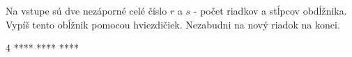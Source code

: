 




Na vstupe sú dve nezáporné celé číslo $r$ a $s$ - počet riadkov a stĺpcov obdĺžnika. Vypíš tento obĺžnik pomocou hviezdičiek.
Nezabudni na nový riadok na konci.

 4
\vystup
****
****
****
\koniec


